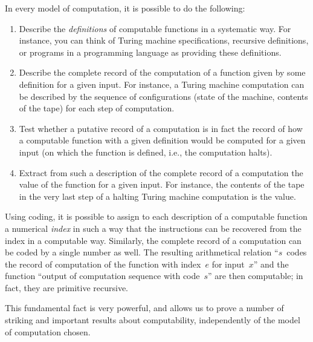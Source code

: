 \documentclass[../../../include/open-logic-section]{subfiles}
\begin{document}

In every model of computation, it is possible to do the following:
\begin{enumerate}
\item Describe the \emph{definitions} of computable functions in a
  systematic way. For instance, you can think of Turing machine
  specifications, recursive definitions, or programs in a programming
  language as providing these definitions.
\item Describe the complete record of the computation of a function
  given by some definition for a given input. For instance, a Turing
  machine computation can be described by the sequence of
  configurations (state of the machine, contents of the tape) for each
  step of computation.
\item Test whether a putative record of a computation is in fact the
  record of how a computable function with a given definition would be
  computed for a given input (on which the function is
  defined, i.e., the computation halts).
\item Extract from such a description of the complete record of a
  computation the value of the function for a given input. For
  instance, the contents of the tape in the very last step of a
  halting Turing machine computation is the value.
\end{enumerate}

Using coding, it is possible to assign to each description of a
computable function a numerical \emph{index} in such a way that the
instructions can be recovered from the index in a computable way.
Similarly, the complete record of a computation can be coded by a
single number as well. The resulting arithmetical relation ``$s$~codes
the record of computation of the function with index~$e$ for
input~$x$'' and the function ``output of computation sequence with
code~$s$'' are then computable; in fact, they are primitive recursive.

This fundamental fact is very powerful, and allows us to prove a
number of striking and important results about computability,
independently of the model of computation chosen.
\end{document}
